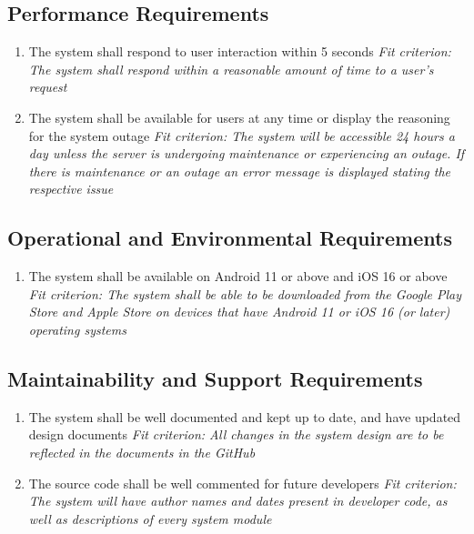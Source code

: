 \documentclass[12pt]{article}
\begin{document}
\subsection{Performance Requirements}
\begin{enumerate}[PR\arabic*.]
	\item The system shall respond to user interaction within 5 seconds\newline
    \textit{Fit criterion: The system shall respond within a reasonable amount of time to a user's request}
    \item The system shall be available for users at any time or display the reasoning for the system outage\newline
    \textit{Fit criterion: The system will be accessible 24 hours a day unless the server is undergoing maintenance or experiencing an outage. If there is maintenance or an outage an error message is displayed stating the respective issue }
\end{enumerate}
\subsection{Operational and Environmental Requirements}
\begin{enumerate}[OE\arabic*.]
    \item The system shall be available on Android 11 or above and iOS 16 or above\newline
    \textit{Fit criterion: The system shall be able to be downloaded from the Google Play Store and Apple Store on devices that have Android 11 or iOS 16 (or later) operating systems}
\end{enumerate}
\subsection{Maintainability and Support Requirements}
\begin{enumerate}[MS\arabic*.]
    \item The system shall be well documented and kept up to date, and have updated design documents\newline
    \textit{Fit criterion: All changes in the system design are to be reflected in the documents in the GitHub}
    \item The source code shall be well commented for future developers\newline
    \textit{Fit criterion: The system will have author names and dates present in developer code, as well as descriptions of every system module}
\end{enumerate}
\end{document}
